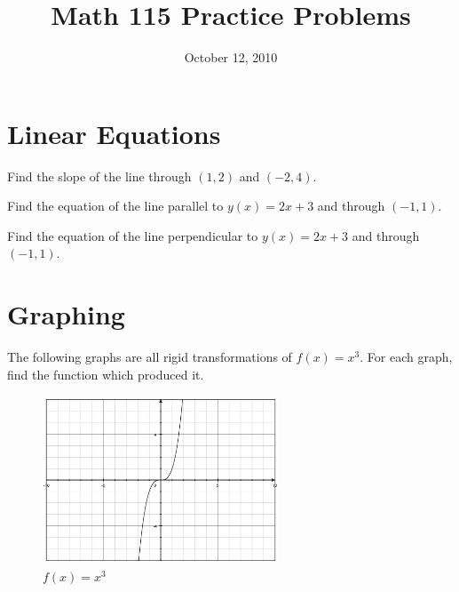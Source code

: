 \documentclass[fleqn,addpoints]{exam}
\title{Math 115 Practice Problems}
\date{October 12, 2010}
\begin{document}
\maketitle

\section{Linear Equations}

\begin{questions}

\question 
Find the slope of the line through $(1, 2)$ and $(-2, 4)$.
\vspace{4cm}

\question
Find the equation of the line parallel to $y(x)=2x+3$ and through $(-1, 1)$.
\vspace{5cm}

\question
Find the equation of the line perpendicular to $y(x)=2x+3$ and through $(-1, 1)$.
\vspace{5cm}

\pagebreak

\section{Graphing}

\question 
The following graphs are all rigid transformations of $f(x) = x^3$.  For each graph, find the function which produced it.

\begin{center}
\begin{figure}[H]
  \includegraphics[width=7cm,height=5cm]{x3}
  \caption{$f(x) = x^3$}
\end{figure}
\end{center}

\begin{parts}


\end{parts}
\end{questions}
\end{document}
